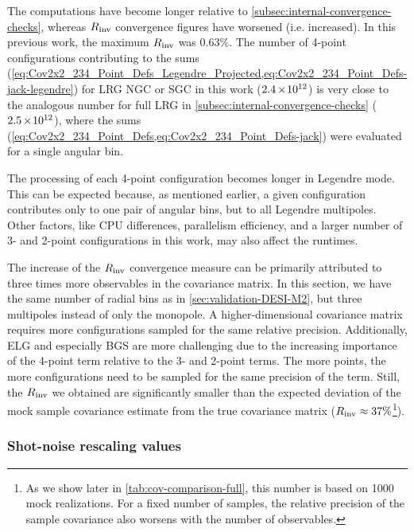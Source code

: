 The computations have become longer relative to \cref{subsec:internal-convergence-checks}, whereas $R_{\rm inv}$ convergence figures have worsened (i.e. increased).
In this previous work, the maximum $R_{\rm inv}$ was $0.63\%$.
The number of 4-point configurations contributing to the sums (\cref{eq:Cov2x2_234_Point_Defs_Legendre_Projected,eq:Cov2x2_234_Point_Defs-jack-legendre}) for LRG NGC or SGC in this work ($2.4\E{12}$) is very close to the analogous number for full LRG in \cref{subsec:internal-convergence-checks} ($2.5\E{12}$), where the sums (\cref{eq:Cov2x2_234_Point_Defs,eq:Cov2x2_234_Point_Defs-jack}) were evaluated for a single angular bin.

The processing of each 4-point configuration becomes longer in Legendre mode.
This can be expected because, as mentioned earlier, a given configuration contributes only to one pair of angular bins, but to all Legendre multipoles.
Other factors, like CPU differences, parallelism efficiency, and a larger number of 3- and 2-point configurations in this work, may also affect the runtimes.

The increase of the $R_{\rm inv}$ convergence measure can be primarily attributed to three times more observables in the covariance matrix.
In this section, we have the same number of radial bins as in \cref{sec:validation-DESI-M2}, but three multipoles instead of only the monopole.
A higher-dimensional covariance matrix requires more configurations sampled for the same relative precision.
Additionally, ELG and especially BGS are more challenging due to the increasing importance of the 4-point term relative to the 3- and 2-point terms.
The more points, the more configurations need to be sampled for the same precision of the term.
Still, the $R_{\rm inv}$ we obtained are significantly smaller than the expected deviation of the mock sample covariance estimate from the true covariance matrix ($R_{\rm inv} \approx 37\%$\footnote{As we show later in \cref{tab:cov-comparison-full}, this number is based on 1000 mock realizations. For a fixed number of samples, the relative precision of the sample covariance also worsens with the number of observables.}).

\subsubsection{Shot-noise rescaling values}
\label{sec:shot-noise-rescaling-values}

